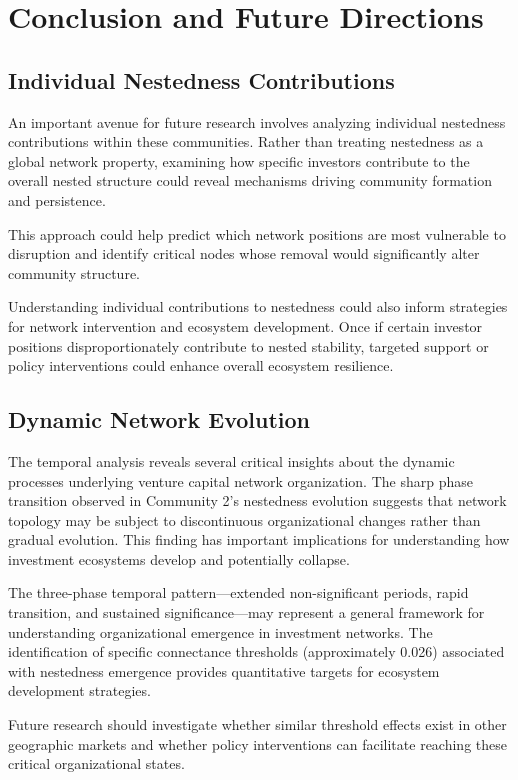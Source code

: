 
\section{Conclusion and Future Directions}

\subsection{Individual Nestedness Contributions}

An important avenue for future research involves analyzing individual nestedness contributions within these communities. Rather than treating nestedness as a global network property, examining how specific investors contribute to the overall nested structure could reveal mechanisms driving community formation and persistence. 

This approach could help predict which network positions are most vulnerable to disruption and identify critical nodes whose removal would significantly alter community structure.

Understanding individual contributions to nestedness could also inform strategies for network intervention and ecosystem development. Once if certain investor positions disproportionately contribute to nested stability, targeted support or policy interventions could enhance overall ecosystem resilience.

\subsection{Dynamic Network Evolution}

The temporal analysis reveals several critical insights about the dynamic processes underlying venture capital network organization. The sharp phase transition observed in Community 2's nestedness evolution suggests that network topology may be subject to discontinuous organizational changes rather than gradual evolution. This finding has important implications for understanding how investment ecosystems develop and potentially collapse.

The three-phase temporal pattern—extended non-significant periods, rapid transition, and sustained significance—may represent a general framework for understanding organizational emergence in investment networks. The identification of specific connectance thresholds (approximately 0.026) associated with nestedness emergence provides quantitative targets for ecosystem development strategies. 

Future research should investigate whether similar threshold effects exist in other geographic markets and whether policy interventions can facilitate reaching these critical organizational states.

